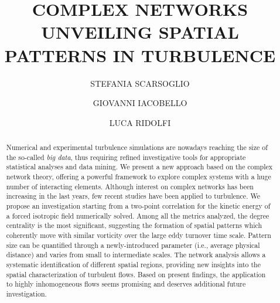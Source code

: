 \documentclass{ws-ijbc}
\begin{document}
\catchline{}{}{}{}{} %


\title{COMPLEX NETWORKS UNVEILING SPATIAL PATTERNS IN TURBULENCE}

\author{STEFANIA SCARSOGLIO}
\address{Department of Mechanical and Aerospace Engineering, Politecnico di Torino\\
Corso Duca degli Abruzzi 24, Torino, Italy\\
stefania.scarsoglio@polito.it}

\author{GIOVANNI IACOBELLO}
\address{Department of Mechanical and Aerospace Engineering, Politecnico di Torino\\
Corso Duca degli Abruzzi 24, Torino, Italy\\
giovanni.iacobello@studenti.polito.it}

\author{LUCA RIDOLFI}
\address{Department of Environmental, Land and Infrastructure Engineering, Politecnico di Torino\\
Corso Duca degli Abruzzi 24, Torino, Italy\\
luca.ridolfi@polito.it}

\maketitle

\begin{history}
\end{history}


\begin{abstract}
Numerical and experimental turbulence simulations are nowadays reaching the size of the so-called \emph{big data}, thus requiring refined investigative tools for appropriate statistical analyses and data mining. We present a new approach based on the complex network theory, offering a powerful framework to explore complex systems with a huge number of interacting elements. Although interest on complex networks has been increasing in the last years, few recent studies have been applied to turbulence. We propose an investigation starting from a two-point correlation for the kinetic energy of a forced isotropic field numerically solved. Among all the metrics analyzed, the degree centrality is the most significant, suggesting the formation of spatial patterns which coherently move with similar vorticity over the large eddy turnover time scale. Pattern size can be quantified through a newly-introduced parameter (i.e., average physical distance) and varies from small to intermediate scales. The network analysis allows a systematic identification of different spatial regions, providing new insights into the spatial characterization of turbulent flows. Based on present findings, the application to highly inhomogeneous flows seems promising and deserves additional future investigation.
\end{abstract}
\end{document}
